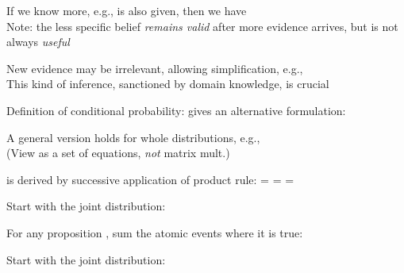 \documentclass{article}
\begin{document}
\begin{huge}
If we know more, e.g.,  is also given, then we have\al
  \\
Note: the less specific belief \emph{remains valid} after more evidence 
arrives, but is not always \emph{useful}

New evidence may be irrelevant, allowing simplification, e.g.,\al
{}\\
This kind of inference, sanctioned by domain knowledge, is crucial


Definition of conditional probability:
\mat{\[
  P(a|b) = \frac{P(a\land b)}{P(b)} \mbox{ if } P(b) \neq 0
\]}
 gives an alternative formulation:\al

A general version holds for whole distributions, e.g.,\al
  \\
(View as a  set of equations, \emph{not} matrix mult.)

 is derived by successive application of product rule:\al
{}\nl
                    = \nl
                  = \mat{$\ldots$}\nl
                  = 


 


Start with the joint distribution:

\textwidth
{}

For any proposition \mat{$\phi$}, sum the atomic events where it is true:\al

\heading{Inference by enumeration}

Start with the joint distribution:

\textwidth
{}


\end{huge}
\end{document}

